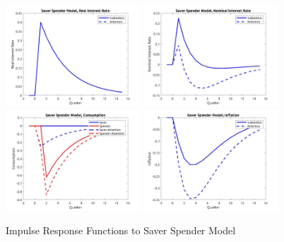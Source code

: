 \documentclass[AER]{AEA}
\begin{document}
\begin{figure}
	\includegraphics[width=0.45\textwidth]{../Code/Dynare/Figures/RealRateSS.jpg}
	\includegraphics[width=0.45\textwidth]{../Code/Dynare/Figures/NominalRateSS.jpg}
	\includegraphics[width=0.45\textwidth]{../Code/Dynare/Figures/ConsumptionSS.jpg}
	\includegraphics[width=0.45\textwidth]{../Code/Dynare/Figures/InflationSS.jpg}
	\caption{Impulse Response Functions to Saver Spender Model}
	\label{fig:IFRSS}
\end{figure}
\end{document}
